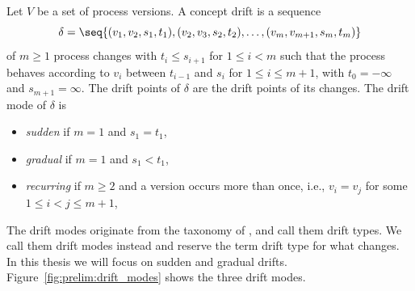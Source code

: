 \begin{definition}
	\label{def:prelim:drift}
	Let $V$ be a set of process versions. A concept drift is a sequence
	\[
		\delta = \seq{(v_1, v_2, s_1, t_1), (v_2, v_3, s_2, t_2), \dots, (v_m, v_{m+1}, s_m, t_m)}
	\]
	of $m \ge 1$ process changes with $t_i \le s_{i+1}$ for $1 \le i < m$ such that the process behaves according to $v_i$ between $t_{i-1}$ and $s_i$ for $1 \le i \le m + 1$, with $t_0 = -\infty$ and $s_{m+1} = \infty$. The drift points of $\delta$ are the drift points of its changes. The drift mode of $\delta$ is
	\begin{itemize}
		\item \emph{sudden} if $m = 1$ and $s_1 = t_1$,
		\item \emph{gradual} if $m = 1$ and $s_1 < t_1$,
		\item \emph{recurring} if $m \ge 2$ and a version occurs more than once, i.e., $v_i = v_j$ for some $1 \le i < j \le m + 1$,
	\end{itemize}
\end{definition}

The drift modes originate from the taxonomy of \textcite{bose2011handling}, and \textcite{kraus2026characterization} call them drift types. We call them drift modes instead and reserve the term drift type for what changes. In this thesis we will focus on sudden and gradual drifts. Figure~\ref{fig:prelim:drift_modes} shows the three drift modes.


